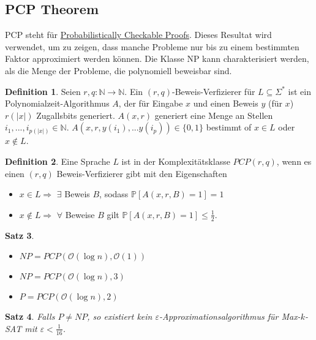 \documentclass[a4paper, 12pt]{article}
\theoremstyle{plain}
\newtheorem{theorem}{Satz}[section] %
\theoremstyle{definition}
\newtheorem{definition}[theorem]{Definition} %
\theoremstyle{lemma}
\theoremstyle{remark}
\theoremstyle{corollary}
\theoremstyle{example}
\begin{document}
	\subsection{PCP Theorem}
	PCP steht für \underline{Probabilistically Checkable Proofs}. Dieses Resultat wird verwendet, um zu zeigen, dass manche Probleme nur bis zu einem bestimmten Faktor approximiert werden können. Die Klasse NP kann charakterisiert werden, als die Menge der Probleme, die polynomiell beweisbar sind.
	\begin{definition}
		Seien $r,q: \mathbb{N} \to \mathbb{N}$. Ein $(r,q)$-Beweis-Verfizierer für $L\subseteq \Sigma^*$ ist ein Polynomialzeit-Algorithmus $A$, der für Eingabe $x$ und einen Beweis $y$ (für $x$) $r(\left|x\right|)$ Zugallsbits generiert. $A(x,r)$ generiert eine Menge an Stellen $i_1,...,i_{p(\left|x\right|)} \in \mathbb{N}$. $A(x,r,y(i_1),... y(i_p)) \in \{0,1\}$ bestimmt of $x \in L$ oder $x \notin L$.
	\end{definition}
	\begin{definition}
		Eine Sprache $L$ ist in der Komplexitätsklasse $PCP(r,q)$, wenn es einen $(r,q)$ Beweis-Verfizierer gibt mit den Eigenschaften \begin{itemize}
			\item $x \in L \Rightarrow$ $\exists$ Beweis $B$, sodass $\mathbb{P}[A(x,r,B) = 1] = 1$
			\item $x \notin L \Rightarrow$ $\forall$ Beweise $B$ gilt $\mathbb{P}[A(x,r,B) = 1] \leq \frac{1}{2}$.
		\end{itemize}
	\end{definition}
	\begin{theorem}
		\begin{itemize}
			\item $NP = PCP(\mathcal{O}(\log n), \mathcal{O}(1))$
			\item $NP = PCP(\mathcal{O}(\log n), 3)$
			\item $P = PCP(\mathcal{O}(\log n), 2)$
		\end{itemize}
	\end{theorem}
	\begin{theorem}
		Falls $P\neq NP$, so existiert kein $\varepsilon$-Approximationsalgorithmus für Max-$k$-SAT mit $\varepsilon < \frac{1}{16}$.
	\end{theorem}
\end{document}
